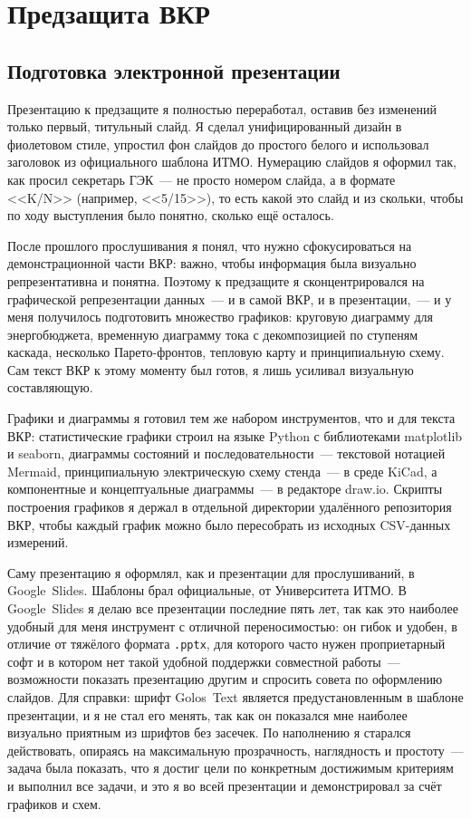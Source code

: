 \section{Предзащита ВКР}

\subsection{Подготовка электронной презентации}

Презентацию к предзащите я полностью переработал, оставив без изменений
только первый, титульный слайд. Я сделал унифицированный дизайн в
фиолетовом стиле, упростил фон слайдов до простого белого и использовал
заголовок из официального шаблона ИТМО. Нумерацию слайдов я оформил так,
как просил секретарь ГЭК~--- не просто номером слайда, а в формате
<<K/N>> (например, <<5/15>>), то есть какой это слайд и из скольки, чтобы
по ходу выступления было понятно, сколько ещё осталось.

После прошлого прослушивания я понял, что нужно сфокусироваться на
демонстрационной части ВКР: важно, чтобы информация была визуально
репрезентативна и понятна. Поэтому к предзащите я сконцентрировался на
графической репрезентации данных~--- и в самой ВКР, и в презентации,~---
и у меня получилось подготовить множество графиков: круговую диаграмму
для энергобюджета, временную диаграмму тока с декомпозицией по ступеням
каскада, несколько Парето-фронтов, тепловую карту и принципиальную
схему. Сам текст ВКР к этому моменту был готов, я лишь усиливал
визуальную составляющую.

Графики и диаграммы я готовил тем же набором инструментов, что и для
текста ВКР: статистические графики строил на языке Python с библиотеками
matplotlib и seaborn, диаграммы состояний и последовательности~---
текстовой нотацией Mermaid, принципиальную электрическую схему стенда~---
в среде KiCad, а компонентные и концептуальные диаграммы~--- в редакторе
draw.io. Скрипты построения графиков я держал в отдельной директории
удалённого репозитория ВКР, чтобы каждый график можно было пересобрать из
исходных CSV-данных измерений.

Саму презентацию я оформлял, как и презентации для прослушиваний, в
Google~Slides. Шаблоны брал официальные, от Университета ИТМО. В
Google~Slides я делаю все презентации последние пять лет, так как это
наиболее удобный для меня инструмент с отличной переносимостью: он гибок
и удобен, в отличие от тяжёлого формата \texttt{.pptx}, для которого
часто нужен проприетарный софт и в котором нет такой удобной поддержки
совместной работы~--- возможности показать презентацию другим и спросить
совета по оформлению слайдов. Для справки: шрифт Golos~Text является
предустановленным в шаблоне презентации, и я не стал его менять, так как
он показался мне наиболее визуально приятным из шрифтов без засечек. По
наполнению я старался действовать, опираясь на максимальную прозрачность,
наглядность и простоту~--- задача была показать, что я достиг цели по
конкретным достижимым критериям и выполнил все задачи, и это я во всей
презентации и демонстрировал за счёт графиков и схем.

